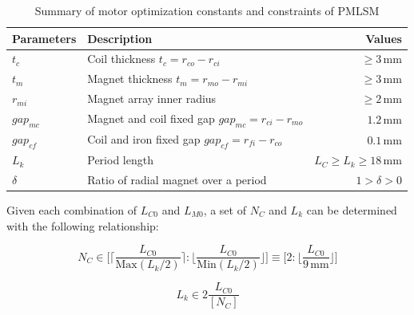             
            \begin{table}
            \renewcommand{\arraystretch}{1.2}
            \caption{Summary of motor optimization constants and constraints of PMLSM}
            \label{table:table_of_optimization_constraints_PMLSM}
            \centering
            \begin{tabular}{llr}
                \hline
                \bfseries Parameters & \bfseries Description & \bfseries Values \\
                \hline
                    $t_c$	        & Coil thickness $t_c = r_{co}-r_{ci}$	    &	$\geq3\,\mathrm{mm}$\\ 
                    $t_m$	        & Magnet thickness $t_m = r_{mo}-r_{mi}$    &	$\geq3\,\mathrm{mm}$\\
                    $r_{mi}$		& Magnet array inner radius 			    &	$\geq2\,\mathrm{mm}$\\ 
                    $gap_{mc}$		& Magnet and coil fixed gap $gap_{mc}=r_{ci}-r_{mo}$    &	$1.2\,\mathrm{mm}$\\ 
                    $gap_{cf}$		& Coil and iron fixed gap $gap_{cf}=r_{fi}-r_{co}$ 	    &	$0.1\,\mathrm{mm}$\\ 
                    $L_k$			& Period length	 						    &	$L_{C} \geq L_k \geq 18\,\mathrm{mm}$\\
                    $\delta$		& Ratio of radial magnet over a period	    & 	$1> \delta >0$\\
                \hline
            \end{tabular}
            \end{table}
            
            
            Given each combination of $L_{C0}$ and $L_{M0}$, a set of $N_C$ and $L_k$ can be determined with the following relationship:
            
            
            \begin{equation}
                N_C \in \Bigg[\bigg\lceil {\frac{L_{C0}}{\mathrm{Max}(L_k/2)}} \bigg\rceil:\bigg\lfloor{\frac{L_{C0}}{\mathrm{Min}(L_k/2)}}\bigg\rfloor\Bigg] \equiv \Bigg[2:\bigg\lfloor{\frac{L_{C0}}{9\,\mathrm{mm}}}\bigg\rfloor\Bigg]
                \label{eq:list of NC}
            \end{equation}
            
            
            \begin{equation}
                L_k \in 2\frac{L_{C0}}{\left[N_C\right]}
                \label{eq:list of L_k}
            \end{equation}
        
